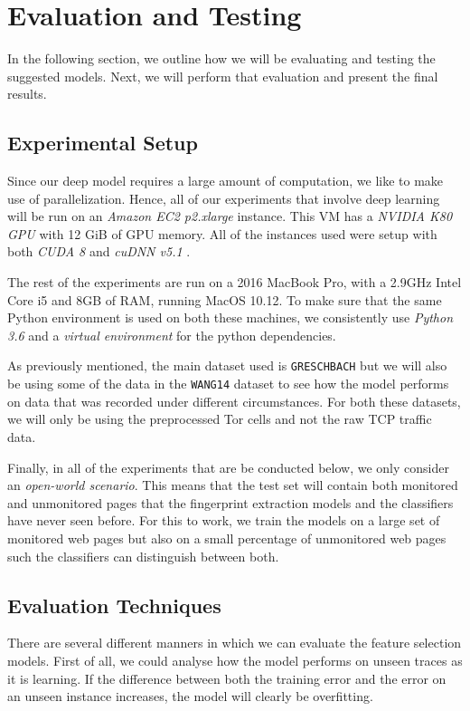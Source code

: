 \chapter{Evaluation and Testing}

In the following section, we outline how we will be evaluating and testing the suggested models.
Next, we will perform that evaluation and present the final results.

\section{Experimental Setup}

Since our deep model requires a large amount of computation, we like to make use of parallelization.
Hence, all of our experiments that involve deep learning will be run on an \textit{Amazon EC2 p2.xlarge} instance.
This VM has a \textit{NVIDIA K80 GPU} with 12 GiB of GPU memory.
All of the instances used were setup with both \textit{CUDA 8} and \textit{cuDNN v5.1} \cite{tensorflow,nvidia_developer_2017}.

The rest of the experiments are run on a 2016 MacBook Pro, with a 2.9GHz Intel Core i5 and 8GB of RAM, running MacOS 10.12.
To make sure that the same Python environment is used on both these machines, we consistently use \textit{Python 3.6} and a \textit{virtual environment} for the python dependencies.

As previously mentioned, the main dataset used is \texttt{GRESCHBACH} but we will also be using some of the data in the \texttt{WANG14} dataset to see how the model performs on data that was recorded under different circumstances.
For both these datasets, we will only be using the preprocessed Tor cells and not the raw TCP traffic data.

Finally, in all of the experiments that are be conducted below, we only consider an \textit{open-world scenario}.
This means that the test set will contain both monitored and unmonitored pages that the fingerprint extraction models and the classifiers have never seen before.
For this to work, we train the models on a large set of monitored web pages but also on a small percentage of unmonitored web pages such the classifiers can distinguish between both.

\section{Evaluation Techniques}

There are several different manners in which we can evaluate the feature selection models.
First of all, we could analyse how the model performs on unseen traces as it is learning.
If the difference between both the training error and the error on an unseen instance increases, the model will clearly be overfitting.

